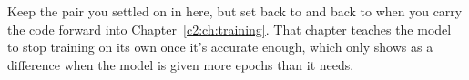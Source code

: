 Keep the pair you settled on in  here, but set  back to
 and  back to  when you carry the code forward into
Chapter~\ref{c2:ch:training}. That chapter teaches the model to stop training on its own once it's
accurate enough, which only shows as a difference when the model is given more epochs than it
needs.
